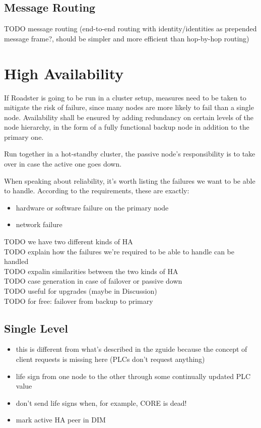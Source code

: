 \subsection{Message Routing}
TODO message routing (end-to-end routing with identity/identities as prepended message frame?, should be simpler and more efficient than hop-by-hop routing)\\

\section{High Availability}\label{sec:meth:ha}
If Roadster is going to be run in a cluster setup, measures need to be taken to
mitigate the risk of failure, since many nodes are more likely to fail than a
single node. Availability shall be ensured by adding redundancy on certain
levels of the node hierarchy, in the form of a fully functional backup node in
addition to the primary one.

Run together in a hot-standby cluster, the passive node's responsibility is to
take over in case the active one goes down.

When speaking about reliability, it's worth listing the failures we want to be
able to handle. According to the requirements, these are exactly:

\begin{itemize}
	\item hardware or software failure on the primary node
	\item network failure
\end{itemize}


TODO we have two different kinds of HA\\
TODO explain how the failures we're required to be able to handle can be handled\\
TODO expalin similarities between the two kinds of HA\\
TODO case generation in case of failover or passive down\\
TODO useful for upgrades (maybe in Discussion)\\
TODO for free: failover from backup to primary\\

\subsection{Single Level}
\begin{itemize}
	\item this is different from what's described in the zguide because the concept of client requests is missing here (PLCs don't request anything)
	\item life sign from one node to the other through some continually updated PLC value
	\item don't send life signs when, for example, CORE is dead!
	\item mark active HA peer in DIM
\end{itemize}


